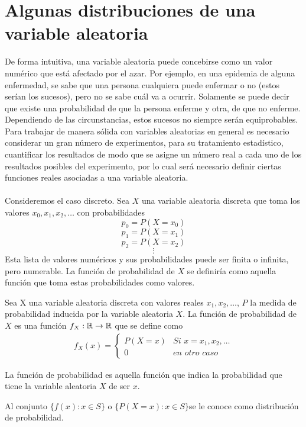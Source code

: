 \section{Algunas distribuciones de una variable aleatoria}
De forma intuitiva, una variable aleatoria puede concebirse como un valor numérico que está afectado por el azar. Por ejemplo, en una epidemia de alguna enfermedad, se sabe que una persona cualquiera puede enfermar o no (estos serían los sucesos), pero no se sabe cuál va a ocurrir. Solamente se puede decir que existe una probabilidad de que la persona enferme y otra, de que no enferme. Dependiendo de las circunstancias, estos sucesos no siempre serán equiprobables.\\
Para trabajar de manera sólida con variables aleatorias en general es necesario considerar un gran número de experimentos, para su tratamiento estadístico, cuantificar los resultados de modo que se asigne un número real a cada uno de los resultados posibles del experimento, por lo cual será necesario definir ciertas funciones reales asociadas a una variable aleatoria.
\\\\
Consideremos el caso discreto. Sea $X$ una variable aleatoria discreta que toma los valores $x_0,x_1,x_2,\ldots$ con probabilidades
$$p_0=P(X=x_0)$$
$$p_1=P(X=x_1)$$
$$p_2=P(X=x_2)$$
$$\vdots$$
Esta lista de valores numéricos y sus probabilidades puede ser finita o infinita, pero numerable. La función de probabilidad de $X$ se definiría como aquella función que toma estas probabilidades como valores.
\begin{Def}
    Sea X una variable aleatoria discreta con valores reales $x_1,x_2,\ldots$, $P$ la medida de probabilidad inducida por la variable aleatoria $X$. La función de probabilidad de $X$ es una función  $f_{X}:{\mathbb{R}}\rightarrow{\mathbb{R}}$ que se define como
    \begin{eqnarray*}
        f_{X}(x)=
        \begin{cases}
            P(X=x) &\textit{Si }x=x_1,x_2,\ldots\\0 &\textit{en otro caso}\label{def-funcionProbabilidad}
        \end{cases}
    \end{eqnarray*}
\end{Def}
La función de probabilidad es aquella función que indica la probabilidad que tiene la variable aleatoria $X$ de ser $x$.
\begin{Def}
\label{def-distribuciónProb}
    Al conjunto $\{f(x): x\in S\}$ o $\{P(X=x): x\in S\} $se le conoce como distribución de probabilidad.
\end{Def}
